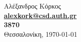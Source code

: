 \begin{titlepage}
    \vspace*{\fill}
    
    \begin{center}
        Αλέξανδρος Κόρκος \\
        \textbf{\href{mailto:alexkork@csd.auth.gr}{alexkork@csd.auth.gr}}\\
        \textbf{3870}
        \Rule \\[0.4cm]
        Θεσσαλονίκη, \today
    \end{center}
    
\end{titlepage}